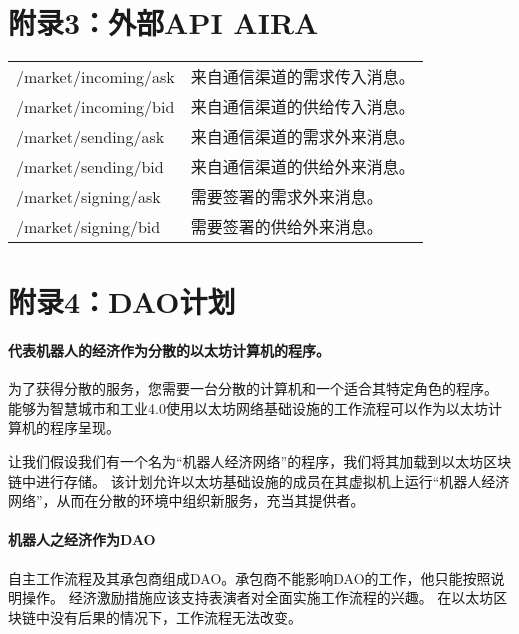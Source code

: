 \documentclass[UTF8]{article}
\begin{document}
\section*{附录3：外部API AIRA}

\begin{tabular}{ l |l}
	/market/incoming/ask & 来自通信渠道的需求传入消息。 \\
	/market/incoming/bid & 来自通信渠道的供给传入消息。 \\
	/market/sending/ask & 来自通信渠道的需求外来消息。 \\
	/market/sending/bid & 来自通信渠道的供给外来消息。 \\
	/market/signing/ask & 需要签署的需求外来消息。 \\
	/market/signing/bid & 需要签署的供给外来消息。 \\
\end{tabular}

\section*{附录4：DAO计划}

\paragraph{代表机器人的经济作为分散的以太坊计算机的程序。}

为了获得分散的服务，您需要一台分散的计算机和一个适合其特定角色的程序。 能够为智慧城市和工业4.0使用以太坊网络基础设施的工作流程可以作为以太坊计算机的程序呈现。

让我们假设我们有一个名为“机器人经济网络”的程序，我们将其加载到以太坊区块链中进行存储。 该计划允许以太坊基础设施的成员在其虚拟机上运行“机器人经济网络”，从而在分散的环境中组织新服务，充当其提供者。

\paragraph{机器人之经济作为DAO}

自主工作流程及其承包商组成DAO。承包商不能影响DAO的工作，他只能按照说明操作。 经济激励措施应该支持表演者对全面实施工作流程的兴趣。 在以太坊区块链中没有后果的情况下，工作流程无法改变。

\end{document}
